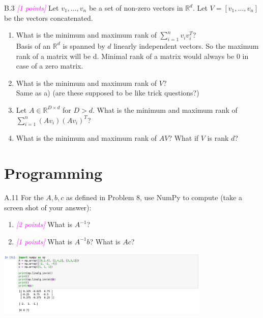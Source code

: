 \documentclass{article}
\newcommand{\1}{\mathbf{1}}
\newcommand{\points}[1]{\small\textcolor{magenta}{\emph{[#1 points]}} \normalsize}
\begin{document}
B.3 \points{1} Let $v_1,\dots,v_n$ be a set of non-zero vectors in $\mathbb{R}^d$. Let $V = [v_1,\dots,v_n]$ be the vectors concatenated. 
    \begin{enumerate}
        \item What is the minimum and maximum rank of $\sum_{i=1}^n v_i v_i^T$? \\
        Basis of an $\mathbb{R}^d$ is spanned by $d$ linearly independent vectors. So the maximum rank of a matrix will be d. Minimal rank of a matrix would always be 0 in case of a zero matrix.
        \item What is the minimum and maximum rank of $V$? \\
        Same as a) (are these supposed to be like trick questions?)
        \item Let $A \in \mathbb{R}^{D \times d}$ for $D > d$. What is the minimum and maximum rank of $\sum_{i=1}^n (A v_i) (A v_i)^T$?
        \item What is the minimum and maximum rank of $AV$? What if $V$ is rank $d$?
    \end{enumerate}

\section*{Programming}

A.11 For the $A, b, c$ as defined in Problem 8, use
  NumPy to compute (take a screen shot of your answer):
  \begin{enumerate}
  \item \points{2} What is $A^{-1}$?
  \item \points{1} What is $A^{-1}b$? What is $Ac$?
  \end{enumerate}  
  
    \begin{center}
    \includegraphics[width=4in]{HW0_plots/numpy.png}
    \end{center} 
\end{document}
